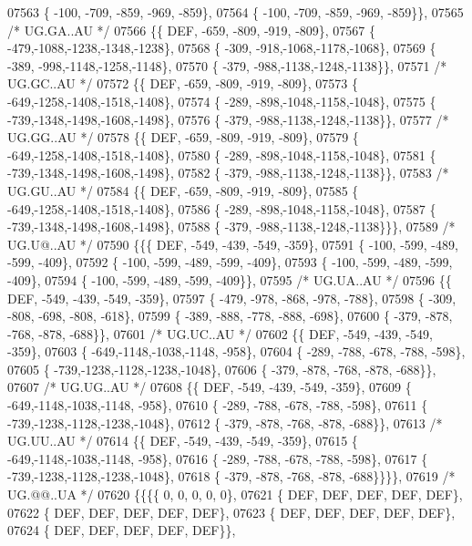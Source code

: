 \begin{DoxyCode}
07563 \{ -100, -709, -859, -969, -859\},
07564 \{ -100, -709, -859, -969, -859\}\},
07565 \textcolor{comment}{/* UG.GA..AU */}
07566 \{\{  DEF, -659, -809, -919, -809\},
07567 \{ -479,-1088,-1238,-1348,-1238\},
07568 \{ -309, -918,-1068,-1178,-1068\},
07569 \{ -389, -998,-1148,-1258,-1148\},
07570 \{ -379, -988,-1138,-1248,-1138\}\},
07571 \textcolor{comment}{/* UG.GC..AU */}
07572 \{\{  DEF, -659, -809, -919, -809\},
07573 \{ -649,-1258,-1408,-1518,-1408\},
07574 \{ -289, -898,-1048,-1158,-1048\},
07575 \{ -739,-1348,-1498,-1608,-1498\},
07576 \{ -379, -988,-1138,-1248,-1138\}\},
07577 \textcolor{comment}{/* UG.GG..AU */}
07578 \{\{  DEF, -659, -809, -919, -809\},
07579 \{ -649,-1258,-1408,-1518,-1408\},
07580 \{ -289, -898,-1048,-1158,-1048\},
07581 \{ -739,-1348,-1498,-1608,-1498\},
07582 \{ -379, -988,-1138,-1248,-1138\}\},
07583 \textcolor{comment}{/* UG.GU..AU */}
07584 \{\{  DEF, -659, -809, -919, -809\},
07585 \{ -649,-1258,-1408,-1518,-1408\},
07586 \{ -289, -898,-1048,-1158,-1048\},
07587 \{ -739,-1348,-1498,-1608,-1498\},
07588 \{ -379, -988,-1138,-1248,-1138\}\}\},
07589 \textcolor{comment}{/* UG.U@..AU */}
07590 \{\{\{  DEF, -549, -439, -549, -359\},
07591 \{ -100, -599, -489, -599, -409\},
07592 \{ -100, -599, -489, -599, -409\},
07593 \{ -100, -599, -489, -599, -409\},
07594 \{ -100, -599, -489, -599, -409\}\},
07595 \textcolor{comment}{/* UG.UA..AU */}
07596 \{\{  DEF, -549, -439, -549, -359\},
07597 \{ -479, -978, -868, -978, -788\},
07598 \{ -309, -808, -698, -808, -618\},
07599 \{ -389, -888, -778, -888, -698\},
07600 \{ -379, -878, -768, -878, -688\}\},
07601 \textcolor{comment}{/* UG.UC..AU */}
07602 \{\{  DEF, -549, -439, -549, -359\},
07603 \{ -649,-1148,-1038,-1148, -958\},
07604 \{ -289, -788, -678, -788, -598\},
07605 \{ -739,-1238,-1128,-1238,-1048\},
07606 \{ -379, -878, -768, -878, -688\}\},
07607 \textcolor{comment}{/* UG.UG..AU */}
07608 \{\{  DEF, -549, -439, -549, -359\},
07609 \{ -649,-1148,-1038,-1148, -958\},
07610 \{ -289, -788, -678, -788, -598\},
07611 \{ -739,-1238,-1128,-1238,-1048\},
07612 \{ -379, -878, -768, -878, -688\}\},
07613 \textcolor{comment}{/* UG.UU..AU */}
07614 \{\{  DEF, -549, -439, -549, -359\},
07615 \{ -649,-1148,-1038,-1148, -958\},
07616 \{ -289, -788, -678, -788, -598\},
07617 \{ -739,-1238,-1128,-1238,-1048\},
07618 \{ -379, -878, -768, -878, -688\}\}\}\},
07619 \textcolor{comment}{/* UG.@@..UA */}
07620 \{\{\{\{    0,    0,    0,    0,    0\},
07621 \{  DEF,  DEF,  DEF,  DEF,  DEF\},
07622 \{  DEF,  DEF,  DEF,  DEF,  DEF\},
07623 \{  DEF,  DEF,  DEF,  DEF,  DEF\},
07624 \{  DEF,  DEF,  DEF,  DEF,  DEF\}\},

\end{DoxyCode}
